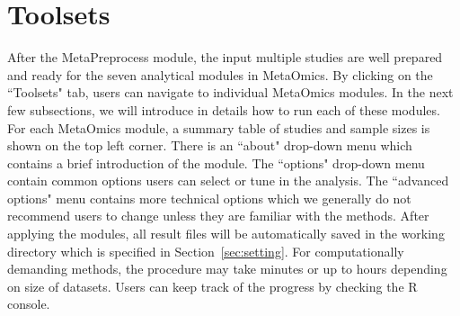 \section{Toolsets}

After the MetaPreprocess module, 
the input multiple studies are well prepared and ready for the seven analytical modules in MetaOmics.
By clicking on the ``Toolsets" tab, users can navigate to individual MetaOmics modules.
In the next few subsections, 
we will introduce in details how to run each of these modules.
For each MetaOmics module, 
a summary table of studies and sample sizes is shown on the top left corner. 
There is an ``about" drop-down menu which contains a brief introduction  of the module.
The ``options" drop-down menu contain common options users can select or tune in the analysis.
The ``advanced options" menu contains more technical options which we generally do not recommend users to change unless they are familiar with the methods.
After applying the modules, 
all result files will be automatically saved in the working directory which is specified in Section~\ref{sec:setting}.
For computationally demanding methods, the procedure may take minutes or up to hours depending on size of datasets.
Users can keep track of the progress by checking the R console.






